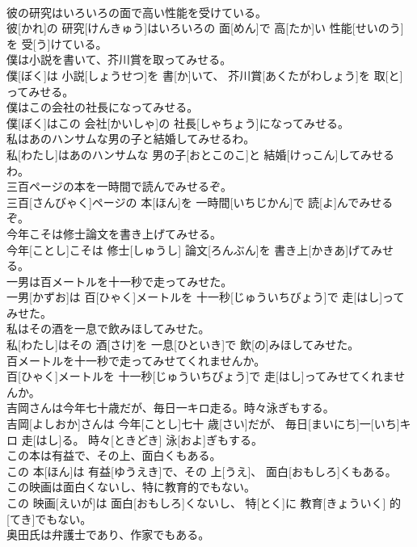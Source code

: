 \documentclass[8pt]{extreport}
\begin{document}
\begin{CJK}{UTF8}{min}
\\	彼の研究はいろいろの面で高い性能を受けている。	
\\	彼[かれ]の 研究[けんきゅう]はいろいろの 面[めん]で 高[たか]い 性能[せいのう]を 受[う]けている。
\\	僕は小説を書いて、芥川賞を取ってみせる。	
\\	僕[ぼく]は 小説[しょうせつ]を 書[か]いて、 芥川賞[あくたがわしょう]を 取[と]ってみせる。
\\	僕はこの会社の社長になってみせる。	
\\	僕[ぼく]はこの 会社[かいしゃ]の 社長[しゃちょう]になってみせる。
\\	私はあのハンサムな男の子と結婚してみせるわ。	
\\	私[わたし]はあのハンサムな 男の子[おとこのこ]と 結婚[けっこん]してみせるわ。
\\	三百ページの本を一時間で読んでみせるぞ。	
\\	三百[さんびゃく]ページの 本[ほん]を 一時間[いちじかん]で 読[よ]んでみせるぞ。
\\	今年こそは修士論文を書き上げてみせる。	
\\	今年[ことし]こそは 修士[しゅうし] 論文[ろんぶん]を 書き上[かきあ]げてみせる。
\\	一男は百メートルを十一秒で走ってみせた。	
\\	一男[かずお]は 百[ひゃく]メートルを 十一秒[じゅういちびょう]で 走[はし]ってみせた。
\\	私はその酒を一息で飲みほしてみせた。	
\\	私[わたし]はその 酒[さけ]を 一息[ひといき]で 飲[の]みほしてみせた。
\\	百メートルを十一秒で走ってみせてくれませんか。	
\\	百[ひゃく]メートルを 十一秒[じゅういちびょう]で 走[はし]ってみせてくれませんか。
\\	吉岡さんは今年七十歳だが、毎日一キロ走る。時々泳ぎもする。	
\\	吉岡[よしおか]さんは 今年[ことし]七十 歳[さい]だが、 毎日[まいにち]一[いち]キロ 走[はし]る。 時々[ときどき] 泳[およ]ぎもする。
\\	この本は有益で、その上、面白くもある。	
\\	この 本[ほん]は 有益[ゆうえき]で、その 上[うえ]、 面白[おもしろ]くもある。
\\	この映画は面白くないし、特に教育的でもない。	
\\	この 映画[えいが]は 面白[おもしろ]くないし、 特[とく]に 教育[きょういく] 的[てき]でもない。
\\	奥田氏は弁護士であり、作家でもある。	

\end{CJK}
\end{document}
